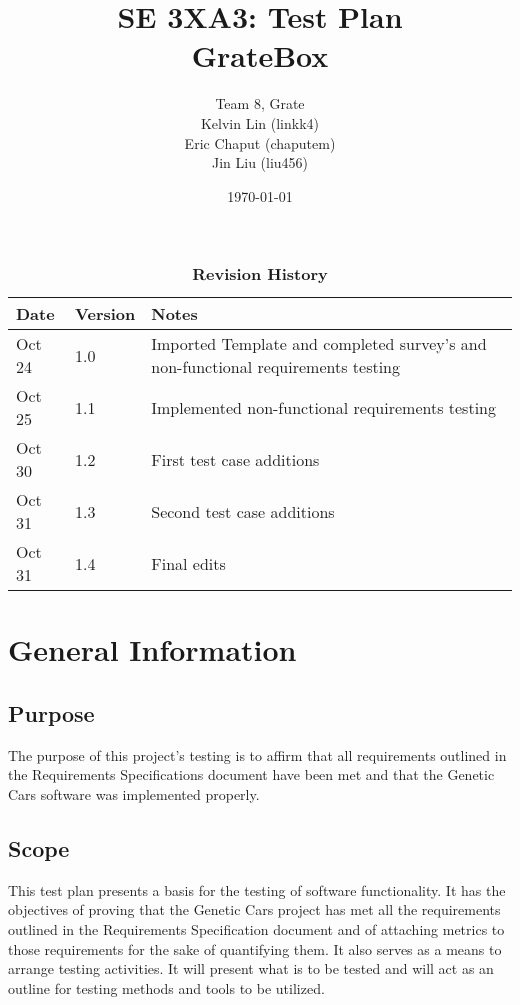 \documentclass[12pt, titlepage]{article}
\title{SE 3XA3: Test Plan\\GrateBox}
\author{Team 8, Grate
		\\ Kelvin Lin (linkk4)
		\\ Eric Chaput (chaputem)
		\\ Jin Liu (liu456)
}
\date{\today}
\begin{document}
\maketitle

\tableofcontents
\listoftables
\listoffigures

\begin{table}[bph]
\caption{\bf Revision History}
\begin{tabularx}{\textwidth}{p{3cm}p{2cm}X}
\toprule {\bf Date} & {\bf Version} & {\bf Notes}\\
\midrule
Oct 24 & 1.0 & Imported Template and completed survey's and non-functional 
requirements  testing\\
Oct 25 & 1.1 & Implemented non-functional requirements testing\\
Oct 30 & 1.2 & First test case additions\\
Oct 31 & 1.3 & Second test case additions\\
Oct 31 & 1.4 & Final edits\\
\bottomrule
\end{tabularx}
\end{table}

\newpage


\section{General Information}

\subsection{Purpose}

The purpose of this project's testing is to affirm that all requirements 
outlined in the Requirements Specifications document have been met and that the 
Genetic Cars software was implemented properly.

\subsection{Scope}

This test plan presents a basis for the testing of software functionality. It 
has the objectives of proving that the Genetic Cars project has met all the 
requirements outlined in the Requirements Specification document and of 
attaching metrics to those requirements for the sake of quantifying them. It 
also serves as a means to arrange testing activities. It will present what is to 
be tested and will act as an outline for testing methods and tools to be 
utilized.
\end{document}
